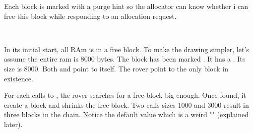 Each block is marked with a purge hint so the allocator can know whether i can free this block while responding to an allocation request.\\
\par
{}\\
\par
In its initial start, all RAm is in a free block. To make the drawing simpler, let's assume the entire ram is 8000 bytes. The block has been marked . It has a  . Its size is 8000. Both  and  point to itself. The rover point to the only block in existence.\\
\par
{}
\par
For each calls to , the rover searches for a free block big enough. Once found, it create a block and shrinks the free block. Two calls sizes 1000 and 3000 result in three blocks in the chain. Notice the default  value which is a weird "" (explained later).\\
\par
{}

